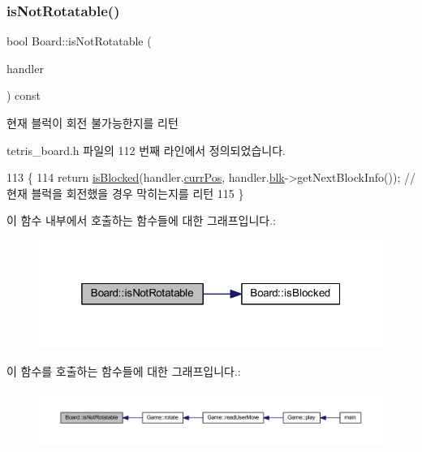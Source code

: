 \subsubsection{\texorpdfstring{is\+Not\+Rotatable()}{isNotRotatable()}}
{\footnotesize\ttfamily bool Board\+::is\+Not\+Rotatable (\begin{DoxyParamCaption}\item[{const \mbox{\hyperlink{class_block_handler}{Block\+Handler}} \&}]{handler }\end{DoxyParamCaption}) const\hspace{0.3cm}{\ttfamily [inline]}}



현재 블럭이 회전 불가능한지를 리턴 



tetris\+\_\+board.\+h 파일의 112 번째 라인에서 정의되었습니다.


\begin{DoxyCode}
113     \{
114         \textcolor{keywordflow}{return} \mbox{\hyperlink{class_board_a61ff9b1284e5c3e1214a780361ed650b}{isBlocked}}(handler.\mbox{\hyperlink{class_block_handler_a11bd634fdc179446f9c6751e2394999e}{currPos}}, handler.\mbox{\hyperlink{class_block_handler_ab57212ded2552ab5559d278c8538c454}{blk}}->getNextBlockInfo()); \textcolor{comment}{// 현재 블럭을
       회전했을 경우 막히는지를 리턴}
115     \}
\end{DoxyCode}
이 함수 내부에서 호출하는 함수들에 대한 그래프입니다.\+:
\nopagebreak
\begin{figure}[H]
\begin{center}
\leavevmode
\includegraphics[width=319pt]{class_board_a4b84310dd1ac3a08a3180361508a43e3_cgraph}
\end{center}
\end{figure}
이 함수를 호출하는 함수들에 대한 그래프입니다.\+:
\nopagebreak
\begin{figure}[H]
\begin{center}
\leavevmode
\includegraphics[width=350pt]{class_board_a4b84310dd1ac3a08a3180361508a43e3_icgraph}
\end{center}
\end{figure}
\mbox{\label{class_board_ad38cdb8757f58a32b5747e2b7e0be277}} 
